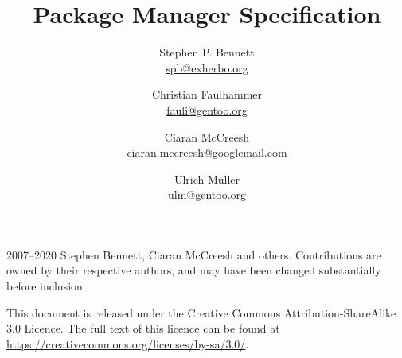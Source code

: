 \documentclass{pms}
\title{Package Manager Specification}
\author{%
    Stephen P. Bennett \\
    \href{mailto:spb@exherbo.org}{spb@exherbo.org}
    \and
    Christian Faulhammer \\
    \href{mailto:fauli@gentoo.org}{fauli@gentoo.org}
    \and
    Ciaran McCreesh \\
    \href{mailto:ciaran.mccreesh@googlemail.com}{ciaran.mccreesh@googlemail.com}
    \and
    Ulrich Müller \\
    \href{mailto:ulm@gentoo.org}{ulm@gentoo.org}
}
\begin{document}
\maketitle

\thispagestyle{empty}
\vspace*{\fill}
{%
    \small
    \textcopyright{} 2007--2020 Stephen Bennett, Ciaran McCreesh and others. Contributions are owned
    by their respective authors, and may have been changed substantially before inclusion.

    This document is released under the Creative Commons Attribution-ShareAlike 3.0 Licence. The
    full text of this licence can be found at \url{https://creativecommons.org/licenses/by-sa/3.0/}.

    \commitinfo
}

\tableofcontents
\listofalgorithms
\listoflistings
\listoftables

































\appendix
\setcounter{secnumdepth}{0}





\end{document}
